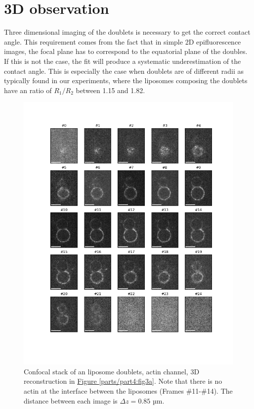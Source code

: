 \documentclass[A4paperpaper,11pt,english]{sphinxmanual}
\begin{document}
\section{3D observation}
\label{parts/part4:d-observation}\label{parts/part4:d-obs}
Three dimensional imaging of the doublets is necessary to get the correct
contact angle. This requirement comes from the fact that in simple 2D epifluorescence
images, the focal plane has to correspond to the equatorial plane of the doubles. If
this is not the case, the fit will produce a systematic underestimation of the contact angle.
This is especially the case when doublets are of different radii as typically found in our
experiments, where the liposomes composing the doublets have an ratio of \(R_1 / R_2\) between 1.15 and 1.82.
\begin{figure}[htbp]
\centering
\capstart

\includegraphics[width=0.900\linewidth]{light_table.png}
\caption{Confocal stack of an liposome doublets, actin channel, 3D reconstruction in
\hyperref[parts/part4:fig3a]{Figure  \ref*{parts/part4:fig3a}}. Note that there is no actin at the interface between
the liposomes (Frames \#11-\#14). The distance between each image is \(\Delta z=0.85\) µm.}\label{parts/part4:confocal-stack}\end{figure}
\end{document}
